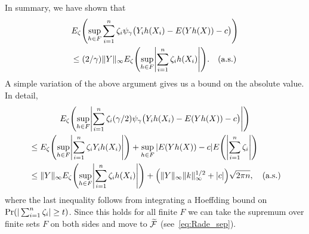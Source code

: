 \documentclass[AHL,Unicode,longabstracts,published]{cedram}
\theoremstyle{remark}
\newcommand{\clF}{\mathcal{F}}
\let\oldtilde\tilde
\renewcommand*{\tilde}[1]{\mathchoice{\widetilde{#1}}{\widetilde{#1}}{\oldtilde{#1}}{\oldtilde{#1}}}
\let\originalleft\left
\let\originalright\right
\renewcommand{\left}{\mathopen{}\mathclose\bgroup\originalleft}
\renewcommand{\right}{\aftergroup\egroup\originalright}
\begin{document}
In summary, we have shown that
\begin{multline*}
E_\zeta \left(
\sup_{h \in F} \sum_{i=1}^n \zeta_i \psi_\gamma\bigl(Y_i h(X_i) - E(Y h(X)) - c\bigr) \right) \\
\leq (2/\gamma) \|Y\|_\infty E_\zeta\left(\sup_{h \in F} \left| \sum_{i=1}^n \zeta_i h(X_i) \right| \right). \text{\quad (a.s.)}
\end{multline*}
A simple variation of the above argument gives us a bound on the absolute value. In detail,
\begin{multline}\label{eq:Rademacher_for_function}
E_\zeta \left(
\sup_{h \in F} \left| \sum_{i=1}^n \zeta_i (\gamma/2) \psi_\gamma\bigl(Y_i h(X_i) - E(Y h(X)) - c\bigr) \right|\right)  \\
\begin{aligned}
&\leq E_\zeta \left(\sup_{h \in F} \left| \sum_{i=1}^n \zeta_i Y_i h(X_i) \right| \right) + \sup_{h\in F} |E(Yh(X)) - c| E\left(\left|\sum_{i=1}^n \zeta_i\right|\right)  \\
&\leq \|Y\|_\infty E_\zeta \left(\sup_{h \in F} \left| \sum_{i=1}^n \zeta_i h(X_i) \right| \right) + \left(\|Y\|_\infty \|k\|_\infty^{1/2} + |c|\right) \sqrt{2\pi n},
\text{\quad (a.s.)}
\end{aligned}
\end{multline}
where the last inequality follows from integrating a Hoeffding bound on $\Pr(|\sum_{i=1}^n\linebreak \zeta_i| \geq t)$. Since this holds for all finite $F$ we can take the supremum over finite sets $F$ on both sides and move to $\tilde{\clF}$ (see~\eqref{eq:Rade_sep}).
\end{document}
